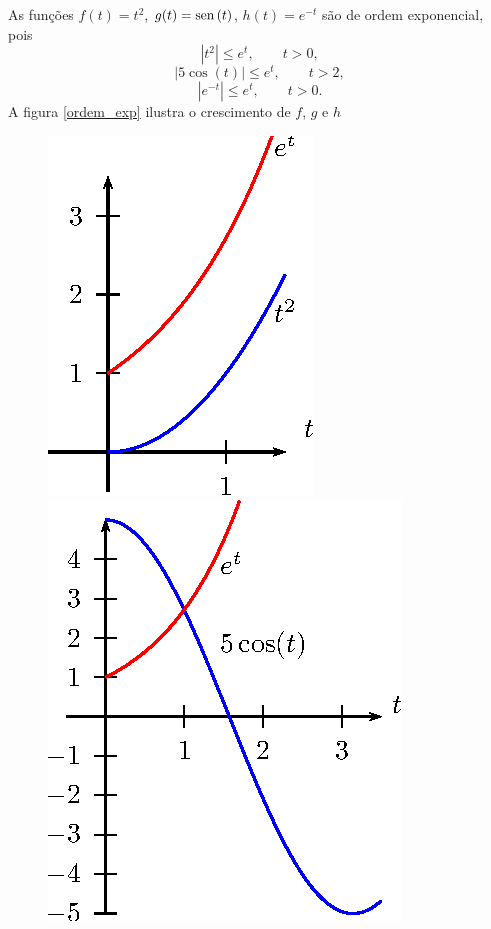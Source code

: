 \begin{ex}As funções $f(t)=t^2$, $g(t)=\operatorname{sen}\,(t)$, $h(t)=e^{-t}$ são de ordem exponencial, pois
$$
|t^2|\leq e^t,\qquad t>0,
$$
$$
|5\cos(t)|\leq e^t,\qquad t>2,
$$
$$
|e^{-t}|\leq e^t,\qquad t>0.
$$
A figura \ref{ordem_exp} ilustra o crescimento de $f$, $g$ e $h$
\begin{figure}[!ht]
\begin{center}

\includegraphics{cap_definicao/pics/figura_1}
\includegraphics{cap_definicao/pics/figura_2}

\end{center}
\end{figure}
\end{ex}
